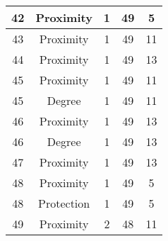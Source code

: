 \documentclass[results.tex]{subfiles}
\begin{document}
\begin{center}
\begin{tabular}{| c || c | c | c | c |}
            \hline
            42                      & Proximity                    & 1                      & 49                      & 5                    \\
            \hline
            43                      & Proximity                    & 1                      & 49                      & 11                   \\
            \hline
            44                      & Proximity                    & 1                      & 49                      & 13                   \\
            \hline
            45                      & Proximity                    & 1                      & 49                      & 11                   \\
            \hline
            45                      & Degree                       & 1                      & 49                      & 11                   \\
            \hline
            46                      & Proximity                    & 1                      & 49                      & 13                   \\
            \hline
            46                      & Degree                       & 1                      & 49                      & 13                   \\
            \hline
            47                      & Proximity                    & 1                      & 49                      & 13                   \\
            \hline
            48                      & Proximity                    & 1                      & 49                      & 5                    \\
            \hline
            48                      & Protection                   & 1                      & 49                      & 5                    \\
            \hline
            49                      & Proximity                    & 2                      & 48                      & 11                   \\
            \hline
        \end{tabular}
    \end{center}
\end{document}
